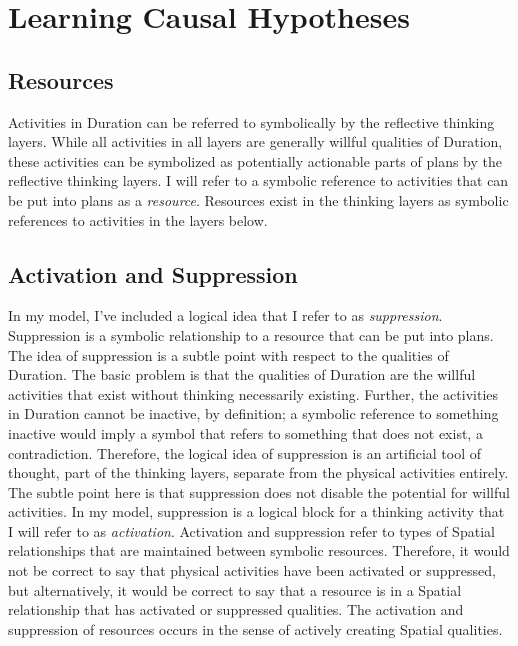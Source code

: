 \chapter{Learning Causal Hypotheses}
\label{chapter:learning_causal_hypotheses}

\section{Resources}

Activities in Duration can be referred to symbolically by the
reflective thinking layers.  While all activities in all layers are
generally willful qualities of Duration, these activities can be
symbolized as potentially actionable parts of plans by the reflective
thinking layers.  I will refer to a symbolic reference to activities
that can be put into plans as a \emph{resource}.  Resources exist in
the thinking layers as symbolic references to activities in the layers
below.

\section{Activation and Suppression}

In my model, I've included a logical idea that I refer to as
\emph{suppression}.  Suppression is a symbolic relationship to a
resource that can be put into plans.  The idea of suppression is a
subtle point with respect to the qualities of Duration.  The basic
problem is that the qualities of Duration are the willful activities
that exist without thinking necessarily existing.  Further, the
activities in Duration cannot be inactive, by definition; a symbolic
reference to something inactive would imply a symbol that refers to
something that does not exist, a contradiction.  Therefore, the
logical idea of suppression is an artificial tool of thought, part of
the thinking layers, separate from the physical activities entirely.
The subtle point here is that suppression does not disable the
potential for willful activities.  In my model, suppression is a
logical block for a thinking activity that I will refer to as
\emph{activation}.  Activation and suppression refer to types of
Spatial relationships that are maintained between symbolic resources.
Therefore, it would not be correct to say that physical activities
have been activated or suppressed, but alternatively, it would be
correct to say that a resource is in a Spatial relationship that has
activated or suppressed qualities.  The activation and suppression of
resources occurs in the sense of actively creating Spatial qualities.

